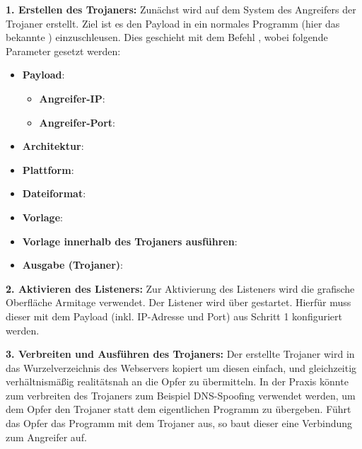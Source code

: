 \textbf{1. Erstellen des Trojaners: }
Zunächst wird auf dem System des Angreifers der Trojaner erstellt.
Ziel ist es den Payload  in ein normales Programm (hier das bekannte ) einzuschleusen. 
Dies geschieht mit dem Befehl  \cite{OSMSFV}, wobei folgende Parameter gesetzt werden:
\begin{itemize}
	\item \textbf{Payload}: \\
	      \begin{itemize}
		      \item  \textbf{Angreifer-IP}: 
		      \item \textbf{Angreifer-Port}: 
		  \end{itemize}
	\item \textbf{Architektur}: 
	\item \textbf{Plattform}: 
	\item \textbf{Dateiformat}: 
	\item \textbf{Vorlage}: 
	\item \textbf{Vorlage innerhalb des Trojaners ausführen}: 
	\item \textbf{Ausgabe (Trojaner)}: 
\end{itemize}

\bigskip
\textbf{2. Aktivieren des Listeners: } 
Zur Aktivierung des Listeners wird die grafische Oberfläche Armitage verwendet.
Der Listener wird über  gestartet.
Hierfür muss dieser mit dem Payload (inkl. IP-Adresse und Port) aus Schritt 1 konfiguriert werden.

\bigskip
\textbf{3. Verbreiten und Ausführen des Trojaners: }
Der erstellte Trojaner wird in das Wurzelverzeichnis des Webservers  kopiert um diesen einfach, und gleichzeitig verhältnismäßig realitätsnah an die Opfer zu übermitteln.
In der Praxis könnte zum verbreiten des Trojaners zum Beispiel DNS-Spoofing verwendet werden, um dem Opfer den Trojaner statt dem eigentlichen Programm zu übergeben.
Führt das Opfer das Programm mit dem Trojaner aus, so baut dieser eine Verbindung zum Angreifer auf. 

